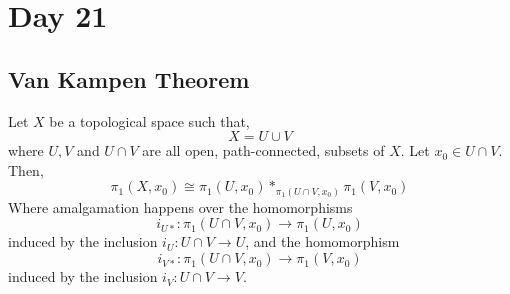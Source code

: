 \documentclass[../notes.tex]{subfiles}
\begin{document}
\section{Day 21}
\subsection{Van Kampen Theorem}
\begin{theorem}
    Let $X$ be a topological space such that,
    \[
        X=U\cup V
    \]
    where $U,V$ and $U\cap V$ are all open, path-connected, subsets
    of $X$. Let $x_0\in U\cap V$. Then,
    \[
        \pi_1(X,x_0)\cong\pi_1(U,x_0)*_{\pi_1(U\cap V, x_0)}
        \pi_1(V,x_0)
    \]
    Where amalgamation happens over the homomorphisms
    \[
        i_{U*}:\pi_1(U\cap V, x_0)\rightarrow \pi_1(U, x_0)
    \]
    induced by the inclusion $i_U: U\cap V \rightarrow U$, and
    the homomorphism
    \[
        i_{V*}:\pi_1(U\cap V, x_0)\rightarrow \pi_1(V, x_0)
    \]
    induced by the inclusion $i_V: U\cap V \rightarrow V$.\\
    \begin{center}
    \end{center}
\end{theorem}
\end{document}
